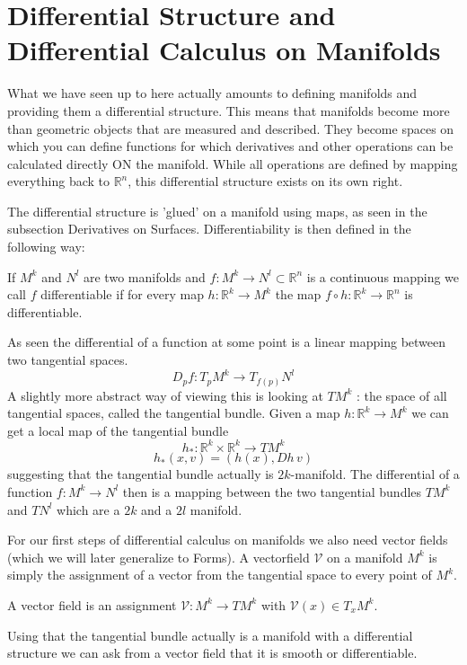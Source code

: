 \section{Differential Structure and Differential Calculus on Manifolds}

What we have seen up to here actually amounts to defining manifolds and providing them a differential structure. This means that manifolds become more than geometric objects that are measured and described. They become spaces on which you can define functions for which derivatives and other operations can be calculated directly ON the manifold. While all operations are defined by mapping everything back to $\mathbb R^n$, this differential structure exists on its own right.

The differential structure is 'glued' on a manifold using maps, as seen in the subsection Derivatives on Surfaces. Differentiability is then defined in the following way:

\begin{definition}[Differentiability] If $M^k$ and $N^l$ are two manifolds and $f: M^k \rightarrow N^l \subset \mathbb R^n$ is a continuous mapping we call $f$ differentiable if for every map $h:\mathbb R^k \rightarrow M^k$ the map $f \circ h :  \mathbb R^k \rightarrow \mathbb R^n$ is differentiable.
\end{definition}

As seen the differential of a function at some point is a linear mapping between two tangential spaces.
\[D_pf: T_p M^k \rightarrow T_{f(p)} N^l\]
A slightly more abstract way of viewing this is looking at $T M^k$ : the space of all tangential spaces, called the tangential bundle. Given a map $h:\mathbb R^k \rightarrow M^k$ we can get a local map of the tangential bundle 
\[h_* : \mathbb R^k \times \mathbb R^k \rightarrow T M^k\]
\[h_*(x,v) = (h(x), Dh\, v)\]
suggesting that the tangential bundle actually is $2k$-manifold. The differential of a function $f: M^k \rightarrow N^l$ then is a mapping between the two tangential bundles $T M^k$ and $T N^l$ which are a $2k$ and a $2l$ manifold.

For our first steps of differential calculus on manifolds we also need vector fields (which we will later generalize to Forms).  A vectorfield $\mathcal V$ on a manifold $M^k$ is simply the assignment of a vector from the tangential space to every point of $M^k$.
\begin{definition}
A vector field is an assignment $\mathcal V: M^k \rightarrow T M^k$ with $\mathcal V(x) \in T_x M^k$.
\end{definition}
Using that the tangential bundle actually is a manifold with a differential structure we can ask from a vector field that it is smooth or differentiable.

